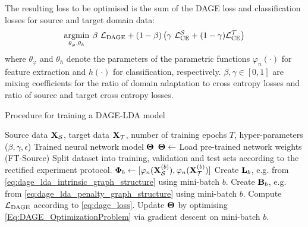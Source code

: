 \documentclass[journal]{IEEEtran}
\renewcommand{\matrix}[1]{\ensuremath{\bm{\mathbf{\uppercase{#1}}}}}
\DeclareMathOperator*{\argmin}{argmin} \DeclareMathOperator*{\argmax}{argmax}
\newcommand{\Src}{\mathcal{S}} \newcommand{\Tgt}{\mathcal{T}}
\begin{document}
The resulting loss to be optimised is the sum of the DAGE loss and classification losses for source and target domain data:
\begin{align}
  \argmin_{\theta_{\varphi}, \theta_{h}} \:
  \beta \ \concept{L}_{\text{DAGE}}
  +
  (1 - \beta) \left(
    \gamma \ \concept{L}_{\text{CE}}^{\Src}
    +
    (1-\gamma) \concept{L}_{\text{CE}}^{\Tgt}
  \right)
\label{Eq:DAGE_OptimizationProblem}
\end{align}
where $\theta_{\varphi}$ and $\theta_{h}$ denote the parameters of the parametric functions $\varphi_n(\cdot)$ for feature extraction and $h(\cdot)$ for classification, respectively. 
$\beta, \gamma \in [0,1]$ are mixing coefficients for the ratio of domain adaptation to cross entropy losses and ratio of source and target cross entropy losses.


\begin{algorithm}[H]
 \caption{Procedure for training a DAGE-LDA model}
 \label{alg:train-dage-lda-model}
  \begin{algorithmic}[1]
 \REQUIRE Source data $\matrix{X}_{\Src}$, target data $\matrix{X}_{\Tgt}$, number of training epochs $T$, hyper-parameters ($\beta, \gamma, \epsilon$)
  \ENSURE  Trained neural network model $\matrix{\Theta}$
  \STATE $\matrix{\Theta} \gets$ Load pre-trained network weights (FT-Source)
  \STATE Split dataset into training, validation and test sets according to the rectified experiment protocol.
  \STATE $\matrix{\Phi}_b \gets 
    [
    \varphi_n ( \matrix{X}^{(b)}_{\Src})
    ,
    \varphi_n ( \matrix{X}^{(b)}_{\Tgt})
    ]
    $
  \STATE Create $\matrix{L}_b$, e.g. from \cref{eq:dage_lda_intrinsic_graph_structure}  using mini-batch $b$.
  \STATE Create $\matrix{B}_b$, e.g. from \cref{eq:dage_lda_penalty_graph_structure} using mini-batch  $b$.
  \STATE Compute $\concept{L}_{\text{DAGE}}$ according to \cref{eq:dage_loss}.
   \STATE Update $\matrix{\Theta}$ by optimising \cref{Eq:DAGE_OptimizationProblem} via gradient descent on mini-batch $b$.
  \ENDFOR
  \ENDFOR
 \end{algorithmic}
 \end{algorithm}
\end{document}
